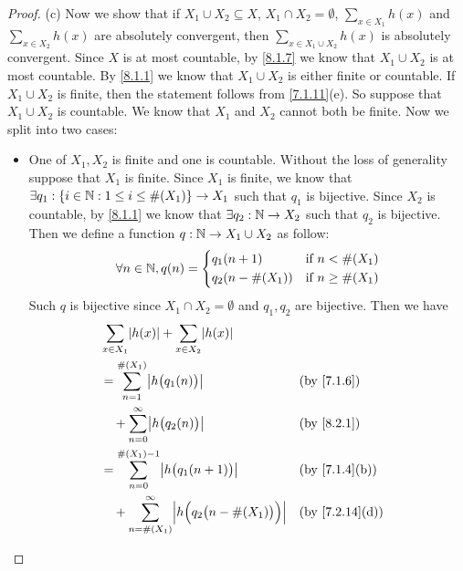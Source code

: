 \begin{proof}{(c)}
  Now we show that if \(X_1 \cup X_2 \subseteq X\), \(X_1 \cap X_2 = \emptyset\), \(\sum_{x \in X_1} h(x)\) and \(\sum_{x \in X_2} h(x)\) are absolutely convergent, then \(\sum_{x \in X_1 \cup X_2} h(x)\) is absolutely convergent.
  Since \(X\) is at most countable, by \cref{8.1.7} we know that \(X_1 \cup X_2\) is at most countable.
  By \cref{8.1.1} we know that \(X_1 \cup X_2\) is either finite or countable.
  If \(X_1 \cup X_2\) is finite, then the statement follows from \cref{7.1.11}(e).
  So suppose that \(X_1 \cup X_2\) is countable.
  We know that \(X_1\) and \(X_2\) cannot both be finite.
  Now we split into two cases:
  \begin{itemize}
    \item One of \(X_1, X_2\) is finite and one is countable.
          Without the loss of generality suppose that \(X_1\) is finite.
          Since \(X_1\) is finite, we know that \(\exists q_1 : \{i \in \mathbb{N} : 1 \leq i \leq \#(X_1)\} \to X_1\) such that \(q_1\) is bijective.
          Since \(X_2\) is countable, by \cref{8.1.1} we know that \(\exists q_2 : \mathbb{N} \to X_2\) such that \(q_2\) is bijective.
          Then we define a function \(q : \mathbb{N} \to X_1 \cup X_2\) as follow:
          \[
            \forall n \in \mathbb{N}, q(n) = \begin{dcases}
              q_1(n + 1)       & \text{if } n < \#(X_1)    \\
              q_2(n - \#(X_1)) & \text{if } n \geq \#(X_1)
            \end{dcases}
          \]
          Such \(q\) is bijective since \(X_1 \cap X_2 = \emptyset\) and \(q_1, q_2\) are bijective.
          Then we have
          \begin{align*}
             & \sum_{x \in X_1} \abs{h(x)} + \sum_{x \in X_2} \abs{h(x)}                                                                              \\
             & = \sum_{n = 1}^{\#(X_1)} \abs{h\big(q_1(n)\big)}                                                     &  & \by{7.1.6}                   \\
             & \quad + \sum_{n = 0}^\infty \abs{h\big(q_2(n)\big)}                                                  &  & \by{8.2.1}                   \\
             & = \sum_{n = 0}^{\#(X_1) - 1} \abs{h\big(q_1(n + 1)\big)}                                             &  & \text{(by \cref{7.1.4}(b))}  \\
             & \quad + \sum_{n = \#(X_1)}^\infty \abs{h\Big(q_2\big(n - \#(X_1)\big)\Big)}                          &  & \text{(by \cref{7.2.14}(d))} \\

\end{align*}
\end{itemize}
\end{proof}

